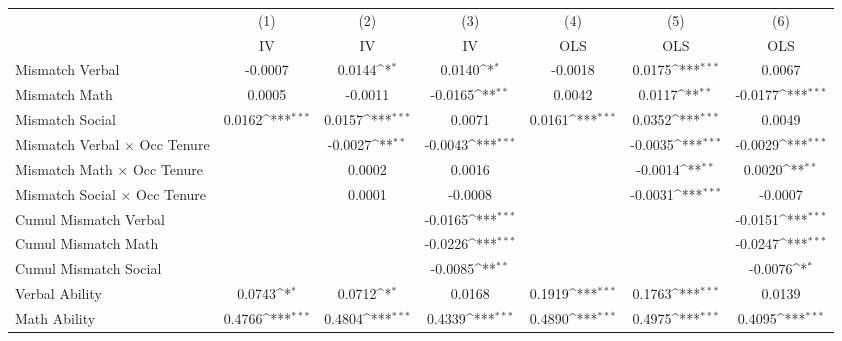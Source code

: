 {
\def\sym#1{\ifmmode^{#1}\else\(^{#1}\)\fi}
\begin{tabular}{l*{6}{c}}
\hline  
                    &\multicolumn{1}{c}{(1)}&\multicolumn{1}{c}{(2)}&\multicolumn{1}{c}{(3)}&\multicolumn{1}{c}{(4)}&\multicolumn{1}{c}{(5)}&\multicolumn{1}{c}{(6)}\\
                    &\multicolumn{1}{c}{IV}&\multicolumn{1}{c}{IV}&\multicolumn{1}{c}{IV}&\multicolumn{1}{c}{OLS}&\multicolumn{1}{c}{OLS}&\multicolumn{1}{c}{OLS}\\
\hline  
Mismatch Verbal     &     -0.0007         &      0.0144\sym{*}  &      0.0140\sym{*}  &     -0.0018         &      0.0175\sym{***}&      0.0067         \\
[1em]
Mismatch Math       &      0.0005         &     -0.0011         &     -0.0165\sym{**} &      0.0042         &      0.0117\sym{**} &     -0.0177\sym{***}\\
[1em]
Mismatch Social     &      0.0162\sym{***}&      0.0157\sym{***}&      0.0071         &      0.0161\sym{***}&      0.0352\sym{***}&      0.0049         \\
[1em]
Mismatch Verbal $\times$ Occ Tenure&                     &     -0.0027\sym{**} &     -0.0043\sym{***}&                     &     -0.0035\sym{***}&     -0.0029\sym{***}\\
[1em]
Mismatch Math $\times$ Occ Tenure&                     &      0.0002         &      0.0016         &                     &     -0.0014\sym{**} &      0.0020\sym{**} \\
[1em]
Mismatch Social $\times$ Occ Tenure&                     &      0.0001         &     -0.0008         &                     &     -0.0031\sym{***}&     -0.0007         \\
[1em]
Cumul Mismatch Verbal&                     &                     &     -0.0165\sym{***}&                     &                     &     -0.0151\sym{***}\\
[1em]
Cumul Mismatch Math &                     &                     &     -0.0226\sym{***}&                     &                     &     -0.0247\sym{***}\\
[1em]
Cumul Mismatch Social&                     &                     &     -0.0085\sym{**} &                     &                     &     -0.0076\sym{*}  \\
[1em]
Verbal Ability      &      0.0743\sym{*}  &      0.0712\sym{*}  &      0.0168         &      0.1919\sym{***}&      0.1763\sym{***}&      0.0139         \\
[1em]
Math Ability        &      0.4766\sym{***}&      0.4804\sym{***}&      0.4339\sym{***}&      0.4890\sym{***}&      0.4975\sym{***}&      0.4095\sym{***}\\

\end{tabular}}
